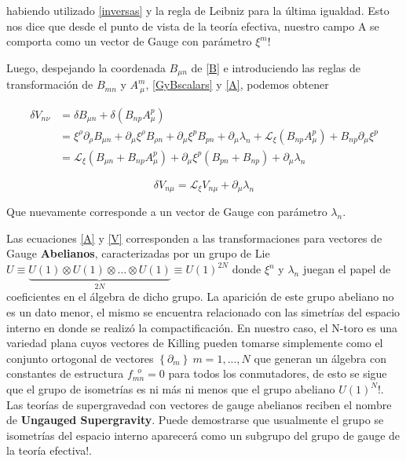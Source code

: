 \documentclass{article}
\numberwithin{equation}{section}
\begin{document}
habiendo utilizado \ref{inversas} y la regla de Leibniz para la última igualdad. Esto nos dice que desde el punto de vista de la teoría efectiva, nuestro campo A se comporta como un vector de Gauge con parámetro $ \xi^m $! 

Luego, despejando la coordenada $ B_{\mu n} $ de \ref{B} e introduciendo las reglas de transformación de $ B_{m n} $ y $ A^m_{\ \mu} $, \ref{GyBscalars} y \ref{A}, podemos obtener 


\begin{equation*}
\begin{aligned}
\delta V_{n \nu} &= \delta B_	{\mu n}  + \delta \left( B_{n p} A^p_{\mu} \right)\\
&= \xi^{\rho} \partial_{\rho} B_{\mu n} + \partial_{\mu} \xi^{\rho} B_{\rho n} + \partial_{\mu} \xi^{p} B_{p n} + \partial_{\mu} \lambda_n + \mathcal{L}_{\xi} \left( B_{n p} A^p_{\mu} \right) + B_{n p} \partial_{\mu} \xi^p\\
&=\mathcal{L}_{\xi} \left( B_	{\mu n} +  B_{n p} A^p_{\mu} \right) + \partial_{\mu} \xi^p \left( B_{p n} + B_{n p}\right) + \partial_{\mu} \lambda_n
\end{aligned}
\end{equation*}

\begin{boxquation}
	\begin{equation}\label{V}
	\delta V_{n \mu}= \mathcal{L}_{\xi} V_{n \mu} + \partial_{\mu} \lambda_n
	\end{equation}
\end{boxquation}

Que nuevamente corresponde a un vector de Gauge con parámetro $ \lambda_n $.

Las ecuaciones \ref{A} y \ref{V} corresponden a las transformaciones para vectores de Gauge \textbf{Abelianos}, caracterizadas por un grupo de Lie $ U \equiv \underbrace{U(1) \otimes U(1) \otimes \dots \otimes U(1)}_{2N} \equiv U(1)^{2N} $ donde $ \xi^n $ y $ \lambda_n $ juegan el papel de coeficientes en el álgebra de dicho grupo. La aparición de este grupo abeliano no es un dato menor, el mismo se encuentra relacionado con las simetrías del espacio interno en donde se realizó la compactificación. En nuestro caso, el N-toro es una variedad plana cuyos vectores de Killing pueden tomarse simplemente como el conjunto ortogonal de vectores $ \left\{ \partial_m  \right\} \ m=1,...,N$ que generan un álgebra con constantes de estructura $ f_{m n}^{\ \ \ o} = 0 $ para todos los conmutadores, de esto se sigue que el grupo de isometrías es ni más ni menos que el grupo abeliano $ U(1)^N $!. Las teorías de supergravedad con vectores de gauge abelianos reciben el nombre de \textbf{Ungauged Supergravity}. Puede demostrarse que usualmente el grupo se isometrías del espacio interno aparecerá como un subgrupo del grupo de gauge de la teoría efectiva!. 
\end{document}
